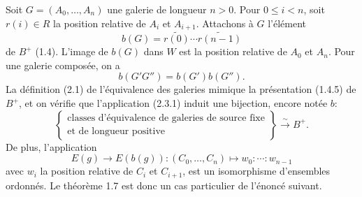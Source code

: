 \documentclass[11pt]{article}
\begin{document}
Soit $G=(A_0,\ldots,A_n)$ une galerie de longueur $n>0$. Pour $0\leq i<n$, soit $r(i)\in R$ la position relative de $A_i$ et $A_{i+1}$. Attachons à $G$ l'élément
\begin{equation}
 b(G)=\widetilde{r(0)}\cdots\widetilde{r(n-1)}
\tag{2.3.1}
\end{equation}
de $B^+$ (1.4). L'image de $b(G)$ dans $W$ est la position relative de $A_0$ et $A_n$. Pour une galerie composée, on a
\begin{equation}
 b(G'G'')=b(G')b(G'').
\tag{2.3.2}
\end{equation}
La définition (2.1) de l'équivalence des galeries mimique la présentation (1.4.5) de $B^+$, et on vérifie que l'application (2.3.1) induit une bijection, encore notée $b$:
\begin{equation}
\left\{
\begin{array}{c}
\text{classes d'équivalence de galeries de source fixe}\\
\text{et de longueur positive}
\end{array}
\right\}\xrightarrow{\sim}B^+.
\tag{2.3.3}
\end{equation}
De plus, l'application
\[
 E(g)\to E(b(g)):(C_0,\ldots,C_n)\mapsto w_0:\cdots:w_{n-1}
\]
avec $w_i$ la position relative de $C_i$ et $C_{i+1}$, est un isomorphisme d'ensembles ordonnés. Le théorème 1.7 est donc un cas particulier de l'énoncé suivant.
\end{document}

